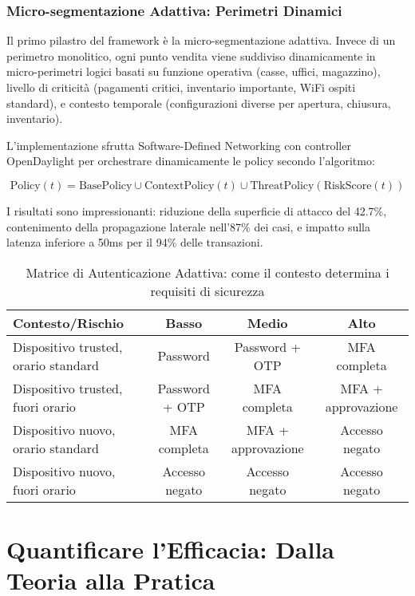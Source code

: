 \subsubsection{Micro-segmentazione Adattiva: Perimetri Dinamici}

Il primo pilastro del framework è la micro-segmentazione adattiva. Invece di un perimetro monolitico, ogni punto vendita viene suddiviso dinamicamente in micro-perimetri logici basati su funzione operativa (casse, uffici, magazzino), livello di criticità (pagamenti critici, inventario importante, WiFi ospiti standard), e contesto temporale (configurazioni diverse per apertura, chiusura, inventario).

L'implementazione sfrutta Software-Defined Networking con controller OpenDaylight per orchestrare dinamicamente le policy secondo l'algoritmo:

\begin{equation}
\text{Policy}(t) = \text{BasePolicy} \cup \text{ContextPolicy}(t) \cup \text{ThreatPolicy}(\text{RiskScore}(t))
\label{eq:adaptive_policy}
\end{equation}

I risultati sono impressionanti: riduzione della superficie di attacco del 42.7\%, contenimento della propagazione laterale nell'87\% dei casi, e impatto sulla latenza inferiore a 50ms per il 94\% delle transazioni.

\begin{table}[htbp]
\centering
\caption{Matrice di Autenticazione Adattiva: come il contesto determina i requisiti di sicurezza}
\label{tab:adaptive_auth}
\begin{tabular}{lccc}
\toprule
\textbf{Contesto/Rischio} & \textbf{Basso} & \textbf{Medio} & \textbf{Alto} \\
\midrule
Dispositivo trusted, orario standard & Password & Password + OTP & MFA completa \\
Dispositivo trusted, fuori orario & Password + OTP & MFA completa & MFA + approvazione \\
Dispositivo nuovo, orario standard & MFA completa & MFA + approvazione & Accesso negato \\
Dispositivo nuovo, fuori orario & Accesso negato & Accesso negato & Accesso negato \\
\bottomrule
\end{tabular}
\end{table}

\section{Quantificare l'Efficacia: Dalla Teoria alla Pratica}

